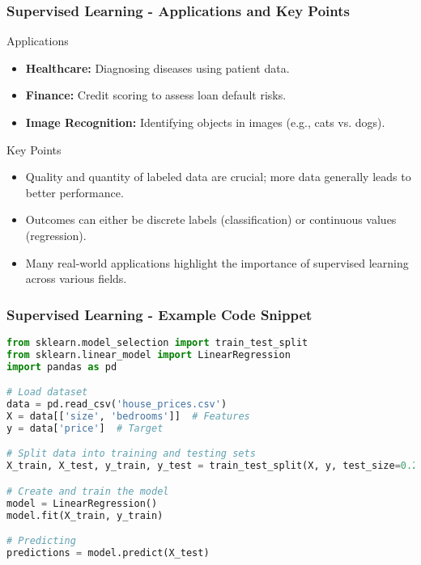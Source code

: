 \documentclass{beamer}
\begin{document}
\begin{frame}[fragile]
    \frametitle{Supervised Learning - Applications and Key Points}
    \begin{block}{Applications}
        \begin{itemize}
            \item \textbf{Healthcare:} Diagnosing diseases using patient data.
            \item \textbf{Finance:} Credit scoring to assess loan default risks.
            \item \textbf{Image Recognition:} Identifying objects in images (e.g., cats vs. dogs).
        \end{itemize}
    \end{block}

    \begin{block}{Key Points}
        \begin{itemize}
            \item Quality and quantity of labeled data are crucial; more data generally leads to better performance.
            \item Outcomes can either be discrete labels (classification) or continuous values (regression).
            \item Many real-world applications highlight the importance of supervised learning across various fields.
        \end{itemize}
    \end{block}
\end{frame}

\begin{frame}[fragile]
    \frametitle{Supervised Learning - Example Code Snippet}
    \begin{lstlisting}[language=Python]
from sklearn.model_selection import train_test_split
from sklearn.linear_model import LinearRegression
import pandas as pd

# Load dataset
data = pd.read_csv('house_prices.csv')
X = data[['size', 'bedrooms']]  # Features
y = data['price']  # Target

# Split data into training and testing sets
X_train, X_test, y_train, y_test = train_test_split(X, y, test_size=0.2, random_state=42)

# Create and train the model
model = LinearRegression()
model.fit(X_train, y_train)

# Predicting
predictions = model.predict(X_test)
    \end{lstlisting}
\end{frame}
\end{document}
